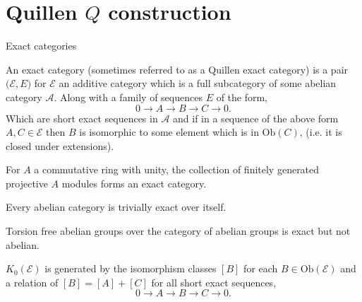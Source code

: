 \documentclass[10pt]{beamer}
\begin{document}
\section{Quillen \( Q \) construction}
\begin{frame}{Exact categories}
	\begin{definition}\label{defexactcat}
		An exact category (sometimes referred to as a Quillen exact category) is a pair $\mathcal{(E},E)$ for $\mathcal{E}$ an additive category which is a full subcategory of some abelian category $\mathcal{A}$. Along with a family of sequences $E$ of the form, \[ 0 \to A \to B \to C \to 0. \] Which are short exact sequences in $\mathcal{A}$ and if in a sequence of the above form $A, C \in \mathcal{E}$ then $B $ is isomorphic to some element which is in $\mathrm{Ob}(C)$, (i.e. it is closed under extensions).
	\end{definition}
	\begin{example}
		For \(A\) a commutative ring with unity, the collection of finitely generated projective \( A \) modules forms an exact category. 
	\end{example}
	\begin{example}
		Every abelian category is trivially exact over itself.
	\end{example}
	\begin{example}Torsion free abelian groups over the category of abelian groups is exact but not abelian.
	\end{example}
	
	\begin{definition}\label{def:k0exact}
		$K_0(\mathcal E)$ is generated by the isomorphism classes $[B]$ for each $B \in \mathrm{Ob}(\mathcal{E})$ and a relation of $[B]=[A]+[C]$ for all short exact sequences, \[ 0 \to A \to B \to C \to 0.\]
	\end{definition}
\end{frame}
\end{document}
